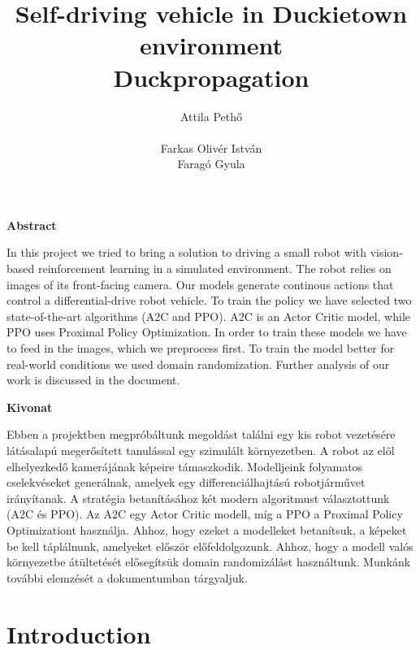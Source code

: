 \documentclass{article}
\title{Self-driving vehicle in Duckietown environment\\
	\large Duckpropagation }
\author{
  Attila Pethő\\\\
   \And  
   Farkas Olivér István \\
   \And
    Faragó Gyula\\
}
\begin{document}

\maketitle



\begin{center}
	\large
	\textbf{Abstract}\\
\end{center}
In this project we tried to bring a solution to driving a small robot with vision-based reinforcement learning in a simulated environment. The robot relies on images of its front-facing camera. Our models generate continous actions that control a differential-drive robot vehicle. To train the policy we have selected two state-of-the-art algorithms (A2C and PPO). A2C is an Actor Critic model, while PPO uses Proximal Policy Optimization. In order to train these models we have to feed in the images, which we preprocess first. To train the model better for real-world conditions we used domain randomization. Further analysis of our work is discussed in the document.

\begin{center}
	\large
	\textbf{Kivonat}\\
\end{center}

Ebben a projektben megpróbáltunk megoldást találni egy kis robot vezetésére látásalapú megerősített tanulással egy szimulált környezetben. A robot az elöl elhelyezkedő kamerájának képeire támaszkodik. Modelljeink folyamatos cselekvéseket generálnak, amelyek egy differenciálhajtású robotjárművet irányítanak. A stratégia betanításához két modern algoritmust választottunk (A2C és PPO). Az A2C egy Actor Critic modell, míg a PPO a Proximal Policy Optimizationt használja. Ahhoz, hogy ezeket a modelleket betanítsuk, a képeket be kell táplálnunk, amelyeket először előfeldolgozunk. Ahhoz, hogy a modell valós környezetbe átültetését elősegítsük domain randomizálást használtunk. Munkánk további elemzését a dokumentumban tárgyaljuk.

\section{\large{Introduction}}
\end{document}
